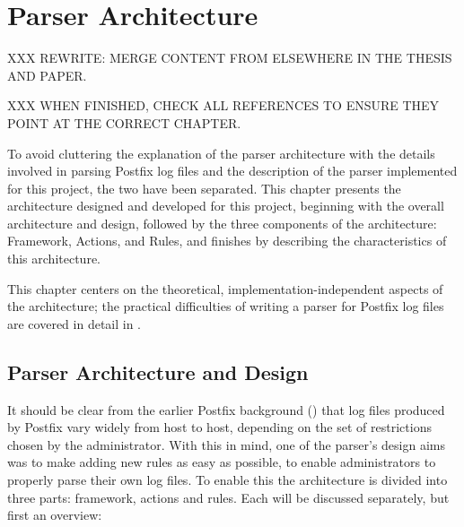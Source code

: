 \chapter{Parser Architecture}

\label{parser architecture}

XXX REWRITE\@: MERGE CONTENT FROM ELSEWHERE IN THE THESIS AND PAPER\@.

XXX WHEN FINISHED, CHECK ALL REFERENCES TO ENSURE THEY POINT AT THE CORRECT
CHAPTER\@.

To avoid cluttering the explanation of the parser architecture with the
details involved in parsing Postfix log files and the description of the
parser implemented for this project, the two have been separated.  This
chapter presents the architecture designed and developed for this project,
beginning with the overall architecture and design, followed by the three
components of the architecture: Framework, Actions, and Rules, and
finishes by describing the characteristics of this architecture.

This chapter centers on the theoretical, implementation-independent aspects
of the architecture; the practical difficulties of writing a parser for
Postfix log files are covered in detail in .

\section{Parser Architecture and Design}

\label{parser design}

It should be clear from the earlier Postfix background () that log files produced by Postfix vary widely from host to
host, depending on the set of restrictions chosen by the administrator.
With this in mind, one of the parser's design aims was to make adding new
rules as easy as possible, to enable administrators to properly parse their
own log files.  To enable this the architecture is divided into three
parts: framework, actions and rules.  Each will be discussed separately,
but first an overview:


